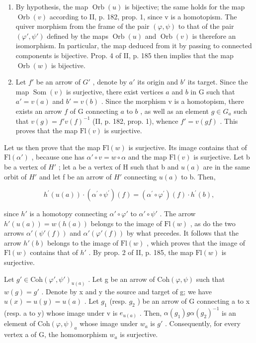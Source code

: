 \begin{enumerate}
\def\labelenumi{\alph{enumi})}
\item
  By hypothesis, the map \(\operatorname{Orb}(u)\) is bijective; the same holds for the map \(\operatorname{Orb}(v)\) according to II, p. 182, prop. 1, since v is a homotopism. The quiver morphism from the frame of the pair \((\varphi,\psi)\) to that of the pair \((\varphi',\psi')\) defined by the maps \(\operatorname{Orb}(u)\) and \(\operatorname{Orb}(v)\) is therefore an isomorphism. In particular, the map deduced from it by passing to connected components is bijective. Prop. 4 of II, p. 185 then implies that the map \(\operatorname{Orb}(w)\) is bijective.
\item
Let \(f'\) be an arrow of \(G'\) , denote by \(a'\) its origin and \(b'\) its target. Since the map \(\operatorname{Som}(v)\) is surjective, there exist vertices \(a\) and \(b\) in G such that \(a' = v(a)\) and \(b' = v(b)\) . Since the morphism v is a homotopism, there exists an arrow \(f\) of G connecting \(a\) to \(b\) , as well as an element \(g \in G_{a}\) such that \(v(g) = f'v(f)^{-1}\) (II, p. 182, prop. 1), whence \(f' = v(gf)\) . This proves that the map \(\mathrm{Fl}(v)\) is surjective.
\end{enumerate}

Let us then prove that the map \(\mathrm{Fl}(w)\) is surjective. Its image contains that of \(\mathrm{Fl}(\alpha')\) , because one has \(\alpha'\circ v=w\circ\alpha\) and the map \(\mathrm{Fl}(v)\) is surjective. Let b be a vertex of \(H'\) ; let a be a vertex of H such that b and \(u(a)\) are in the same orbit of \(H'\) and let f be an arrow of \(H'\) connecting \(u(a)\) to b. Then,

\[
h ^ {\prime} (u (a)) \cdot (\alpha^ {\prime} \circ \psi^ {\prime}) (f) = (\alpha^ {\prime} \circ \varphi^ {\prime}) (f) \cdot h ^ {\prime} (b),
\]

since \(h'\) is a homotopy connecting \(\alpha' \circ \varphi'\) to \(\alpha' \circ \psi'\) . The arrow \(h'(u(a)) = w(h(a))\) belongs to the image of \(\mathrm{Fl}(w)\) , as do the two arrows \(\alpha'(\psi'(f))\) and \(\alpha'(\varphi'(f))\) by what precedes. It follows that the arrow \(h'(b)\) belongs to the image of \(\mathrm{Fl}(w)\) , which proves that the image of \(\mathrm{Fl}(w)\) contains that of \(h'\) . By prop. 2 of II, p. 185, the map \(\mathrm{Fl}(w)\) is surjective.

Let \(g' \in \mathrm{Coh}(\varphi', \psi')_{u(a)}\) . Let g be an arrow of \(\mathrm{Coh}(\varphi, \psi)\) such that \(w(g) = g'\) . Denote by x and y the source and target of g; we have \(u(x) = u(y) = u(a)\) . Let \(g_1\) (resp. \(g_2\) ) be an arrow of G connecting a to x (resp. a to y) whose image under v is \(e_{u(a)}\) . Then, \(\alpha(g_1)g\alpha(g_2)^{-1}\) is an element of \(\mathrm{Coh}(\varphi, \psi)_a\) whose image under \(w_a\) is \(g'\) . Consequently, for every vertex a of G, the homomorphism \(w_a\) is surjective.

